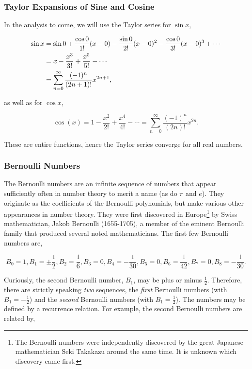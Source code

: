 \documentclass[11pt]{amsart}
\begin{document}
\subsubsection{Taylor Expansions of Sine and Cosine}

In the analysis to come, we will use the Taylor series for $\sin x$,

\begin{align}
\sin x &= \sin 0 + \frac{\cos 0}{1!}(x - 0) - \frac{\sin 0}{2!}(x - 0)^2 - \frac{\cos 0}{3!}(x - 0)^3 + \cdots \notag \\
&= x - \frac{x^3}{3!} + \frac{x^5}{5!} - \cdots \notag \\
&= \sum_{n=0}^{\infty}\frac{(-1)^n}{(2n + 1)!}x^{2n+1}, \notag
\end{align}

as well as for $\cos x$,

$$
\cos(x) = 1 - \frac{x^2}{2!} + \frac{x^4}{4!} - \cdots = \sum_{n=0}^{\infty}\frac{(-1)^n}{(2n)!}x^{2n}.
$$

These are entire functions, hence the Taylor series converge for all real numbers.

\subsubsection{Bernoulli Numbers}

The Bernoulli numbers are an infinite sequence of numbers that appear sufficiently often in number theory to merit a name (as do $\pi$ and $e$). They originate as the coefficients of the Bernoulli polynomials, but make various other appearances in number theory. They were first discovered in Europe\footnote{The Bernoulli numbers were independently discovered by the great Japanese mathematician Seki Takakazu around the same time. It is unknown which discovery came first.} by Swiss mathematician, Jakob Bernoulli (1655-1705), a member of the eminent Bernoulli family that produced several noted mathematicians. The first few Bernoulli numbers are,

$$B_0 = 1, B_1 = \pm \frac{1}{2}, B_2 = \frac{1}{6}, B_3 = 0, B_4 = -\frac{1}{30}, B_5 = 0, B_6 = \frac{1}{42}, B_7 = 0, B_8 = -\frac{1}{30}.$$

Curiously, the second Bernoulli number, $B_1$, may be plus or minus $\frac{1}{2}$. Therefore, there are strictly speaking \emph{two} sequences, the \emph{first} Bernoulli numbers (with $B_1 = -\frac{1}{2}$) and the \emph{second} Bernoulli numbers (with $B_1 = \frac{1}{2}$). The numbers may be defined by a recurrence relation. For example, the second Bernoulli numbers are related by,
\end{document}

